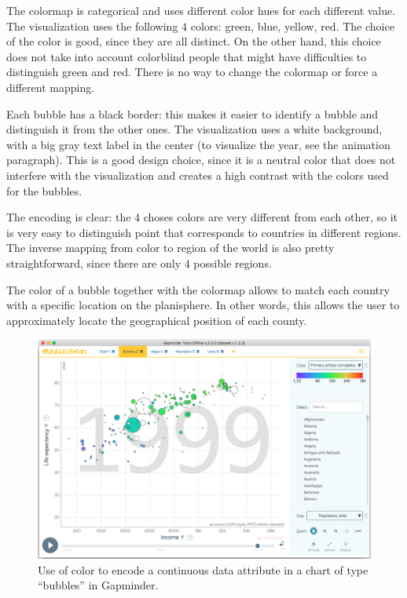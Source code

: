 The colormap is categorical and uses different color hues for each different value.
The visualization uses the following $4$ colors: green, blue, yellow, red.
The choice of the color is good, since they are all distinct.
On the other hand, this choice does not take into account colorblind people that might have difficulties to distinguish green and red.
There is no way to change the colormap or force a different mapping.

Each bubble has a black border:
this makes it easier to identify a bubble and distinguish it from the other ones.
The visualization uses a white background, with a big gray text label in the center (to visualize the year, see the animation paragraph).
This is a good design choice, since it is a neutral color that does not interfere with the visualization and creates a high contrast with the colors used for the bubbles.

The encoding is clear: the $4$ choses colors are very different from each other, so it is very easy to distinguish point that corresponds to countries in different regions.
The inverse mapping from color to region of the world is also pretty straightforward, since there are only $4$ possible regions.

The color of a bubble together with the colormap allows to match each country with a specific location on the planisphere.
In other words, this allows the user to approximately locate the geographical position of each county.

\begin{figure}[h]
	\centering
	\includegraphics[width=0.95\columnwidth]{figures/bubbles-continuous-color}
	\caption{Use of color to encode a continuous data attribute in a chart of type ``bubbles'' in Gapminder.}
	\label{fig:bubbles-continuous-color}
\end{figure}

